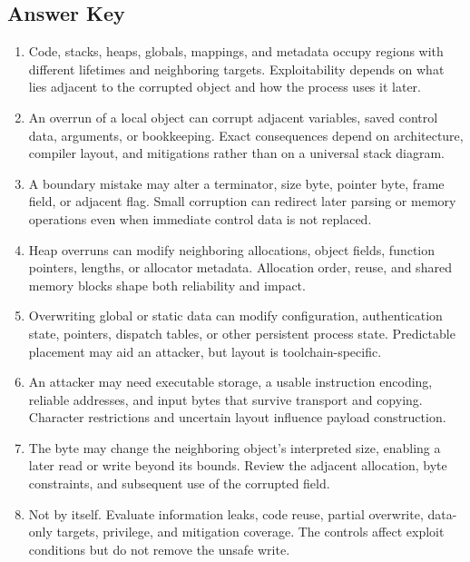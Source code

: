 \documentclass[11pt,letterpaper]{article}
\begin{document}
\subsection*{Answer Key}
\begin{enumerate}
\item Code, stacks, heaps, globals, mappings, and metadata occupy regions with different lifetimes and neighboring targets. Exploitability depends on what lies adjacent to the corrupted object and how the process uses it later.
\item An overrun of a local object can corrupt adjacent variables, saved control data, arguments, or bookkeeping. Exact consequences depend on architecture, compiler layout, and mitigations rather than on a universal stack diagram.
\item A boundary mistake may alter a terminator, size byte, pointer byte, frame field, or adjacent flag. Small corruption can redirect later parsing or memory operations even when immediate control data is not replaced.
\item Heap overruns can modify neighboring allocations, object fields, function pointers, lengths, or allocator metadata. Allocation order, reuse, and shared memory blocks shape both reliability and impact.
\item Overwriting global or static data can modify configuration, authentication state, pointers, dispatch tables, or other persistent process state. Predictable placement may aid an attacker, but layout is toolchain-specific.
\item An attacker may need executable storage, a usable instruction encoding, reliable addresses, and input bytes that survive transport and copying. Character restrictions and uncertain layout influence payload construction.
\item The byte may change the neighboring object's interpreted size, enabling a later read or write beyond its bounds. Review the adjacent allocation, byte constraints, and subsequent use of the corrupted field.
\item Not by itself. Evaluate information leaks, code reuse, partial overwrite, data-only targets, privilege, and mitigation coverage. The controls affect exploit conditions but do not remove the unsafe write.
\end{enumerate}
\end{document}
